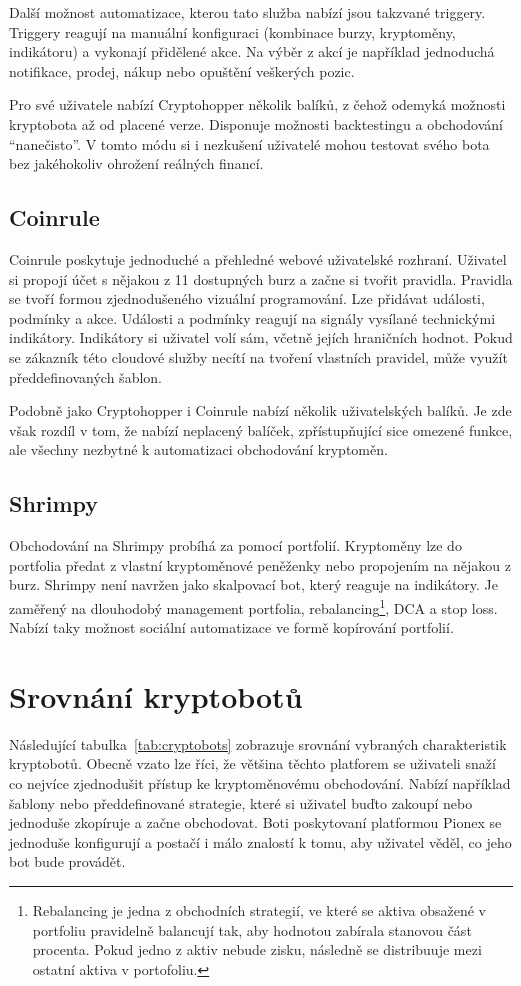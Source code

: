 Další možnost automatizace, kterou tato služba nabízí jsou takzvané triggery. Triggery reagují na manuální konfiguraci (kombinace burzy, kryptoměny, indikátoru) a vykonají
přidělené akce. Na výběr z akcí je například jednoduchá notifikace, prodej, nákup nebo opuštění veškerých pozic.

Pro své uživatele nabízí Cryptohopper několik balíků, z čehož odemyká možnosti kryptobota až od placené verze. Disponuje možnosti backtestingu a obchodování \enquote{nanečisto}.
V tomto módu si i nezkušení uživatelé mohou testovat svého bota bez jakéhokoliv ohrožení reálných financí.

\subsection{Coinrule}
Coinrule poskytuje jednoduché a přehledné webové uživatelské rozhraní. Uživatel si propojí účet s nějakou z 11 dostupných burz a začne si tvořit pravidla. Pravidla se tvoří
formou zjednodušeného vizuální programování. Lze přidávat události, podmínky a akce. Události a podmínky reagují na signály vysílané technickými indikátory. Indikátory
si uživatel volí sám, včetně jejích hraničních hodnot. Pokud se zákazník této cloudové služby necítí na tvoření vlastních pravidel, může využít předdefinovaných šablon.

Podobně jako Cryptohopper i Coinrule nabízí několik uživatelských balíků. Je zde však rozdíl v tom, že nabízí neplacený balíček, zpřístupňující sice omezené funkce, ale
všechny nezbytné k automatizaci obchodování kryptoměn.


\subsection{Shrimpy}
Obchodování na Shrimpy probíhá za pomocí portfolií. Kryptoměny lze do portfolia předat z vlastní kryptoměnové peněženky nebo propojením na nějakou z burz. Shrimpy není navržen jako
skalpovací bot, který reaguje na indikátory. Je zaměřený na dlouhodobý management portfolia, rebalancing\footnote{Rebalancing je jedna z obchodních strategií, ve které
    se aktiva obsažené v portfoliu pravidelně balancují tak, aby hodnotou zabírala stanovou část procenta. Pokud jedno z aktiv nebude zisku, následně se distribuuje mezi ostatní
    aktiva v portofoliu.},
DCA a stop loss. Nabízí taky možnost sociální automatizace ve formě kopírování portfolií.


\section{Srovnání kryptobotů}
Následující tabulka~\ref{tab:cryptobots} zobrazuje srovnání vybraných charakteristik kryptobotů. Obecně vzato lze říci, že většina těchto platforem se uživateli snaží
co nejvíce zjednodušit přístup ke kryptoměnovému obchodování. Nabízí například šablony nebo předdefinované strategie, které si uživatel buďto zakoupí nebo jednoduše zkopíruje
a začne obchodovat. Boti poskytovaní platformou Pionex se jednoduše konfigurují a postačí i málo znalostí k tomu, aby uživatel věděl, co jeho bot bude provádět.

